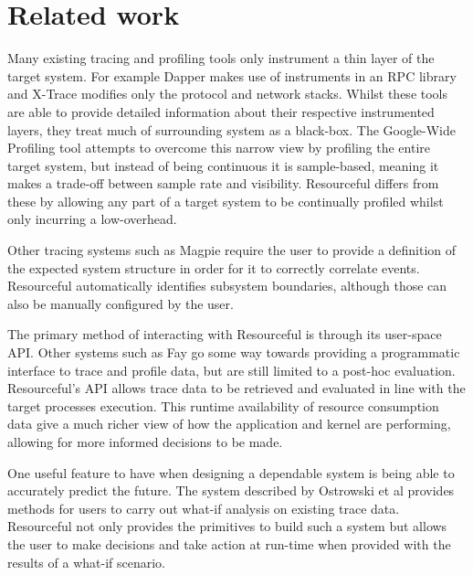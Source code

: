 \documentclass[12pt,twoside,a4paper]{article}
\newcommand{\pname}{Resourceful}
\begin{document}
\section{Related work} 




Many existing tracing and profiling tools only instrument a thin layer of the
target system. For example Dapper \cite{dapper} makes use of instruments in an
RPC library and X-Trace \cite{xtrace} modifies only the protocol and network
stacks. Whilst these tools are able to provide detailed information about their
respective instrumented layers, they treat much of surrounding system as a
black-box. The Google-Wide Profiling tool \cite{gwp} attempts to overcome this 
narrow view by profiling the entire target system, but instead of being continuous 
it is sample-based, meaning it makes a trade-off between sample rate and visibility. 
\pname{ } differs from these by allowing any part of a target system
to be continually profiled whilst only incurring a low-overhead.  

Other tracing systems such as Magpie \cite{magpieosdi} require the user to
provide a definition of the expected system structure in order for it to
correctly correlate events. \pname{} automatically identifies subsystem
boundaries, although those can also be manually configured by the user.

The primary method of interacting with \pname{} is through its user-space API.
Other systems such as Fay \cite{fay} go some way towards providing a programmatic
interface to trace and profile data, but are still limited to a post-hoc
evaluation. \pname{}'s API allows trace data to be retrieved and evaluated in
line with the target processes execution. This runtime availability of resource
consumption data give a much richer view of how the application and kernel are
performing, allowing for more informed decisions to be made. 

One useful feature to have when designing a dependable system is being able to
accurately predict the future. The system described by Ostrowski et al
\cite{ostrowski} provides methods for users to carry out what-if analysis on
existing trace data. \pname{} not only provides the primitives to build such a
system but allows the user to make decisions and take action at run-time when
provided with the results of a what-if scenario.
\end{document}
